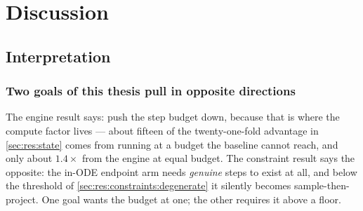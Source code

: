 %


\chapter{Discussion}\label{ch:discussion}

\section{Interpretation}\label{sec:disc:interpretation}

\subsection*{Two goals of this thesis pull in opposite directions}

The engine result says: push the step budget down, because that is where the compute factor lives
--- about fifteen of the twenty-one-fold advantage in \autoref{sec:res:state} comes from running at
a budget the baseline cannot reach, and only about $1.4\times$ from the engine at equal budget. The
constraint result says the opposite: the in-ODE endpoint arm needs \emph{genuine} steps to exist at
all, and below the threshold of \autoref{sec:res:constraints:degenerate} it silently becomes
sample-then-project. One goal wants the budget at one; the other requires it above a floor.

